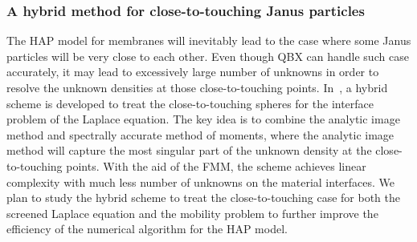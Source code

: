 %

\subsubsection{A hybrid method for close-to-touching Janus particles}
The HAP model for membranes will inevitably lead to the case where some
Janus particles will be very close to each other. Even though QBX can
handle such case accurately, it may lead to excessively large number of
unknowns in order to resolve the unknown densities at those
close-to-touching points. In~\cite{gan2016sisc}, a hybrid scheme is
developed to treat the close-to-touching spheres for the interface
problem of the Laplace equation. The key idea is to combine the analytic
image method and spectrally accurate method of moments, where the
analytic image method will capture the most singular part of the unknown
density at the close-to-touching points. With the aid of the FMM, the
scheme achieves linear complexity with much less number of unknowns on
the material interfaces. We plan to study the hybrid scheme to treat
the close-to-touching case for both the screened Laplace equation and
the mobility problem to further improve the efficiency of the numerical
algorithm for the HAP model.


